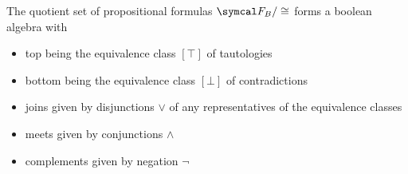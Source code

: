 \begin{theorem}\label{thm:propositional_logic_boolean_algebra}
  The quotient set of propositional formulas $\Cal{F}_B / \cong$ forms a boolean algebra with
  \begin{itemize}
    \item top being the equivalence class $[\top]$ of tautologies
    \item bottom being the equivalence class $[\bot]$ of contradictions
    \item joins given by disjunctions $\lor$ of any representatives of the equivalence classes
    \item meets given by conjunctions $\land$
    \item complements given by negation $\neg$
  \end{itemize}
\end{theorem}

